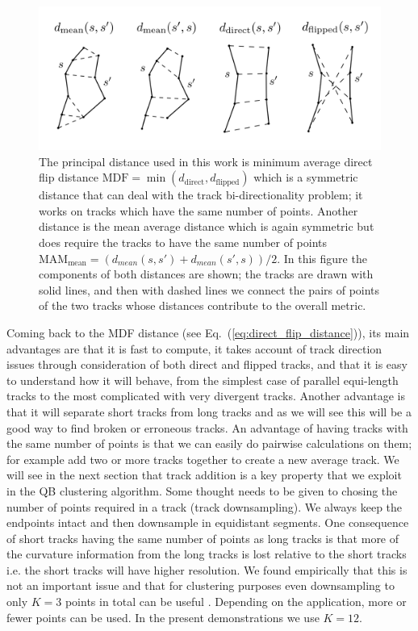 \documentclass[preprint,authoryear,a4paper,10pt,onecolumn]{elsarticle}
\begin{document}
\begin{figure}
\includegraphics[scale=0.5]{distances2}
\centering{}\caption{The principal distance used in this work is minimum average
direct flip distance $\textrm{MDF}=\min(d_{\textrm{direct}},d_{\textrm{flipped}})$
which is a symmetric distance that can deal with the track bi-directionality
problem; it works on tracks which have the same number of points.
Another distance is the mean average distance which is again symmetric
but does require the tracks to have the same number of points
$\textrm{MAM}_{\textrm{mean}}=(d_{mean}(s,s')+d_{mean}(s',s))/2$.
In this figure the components of both distances are shown; the tracks are drawn with solid
lines, and then with dashed lines we connect the
pairs of points of the two tracks whose distances contribute to the
overall metric.\label{Flo:Distances_used}}
\end{figure}

Coming back to the MDF distance (see Eq.~(\ref{eq:direct_flip_distance})),
its main advantages are that it is fast to compute, it takes account of
track direction issues through consideration of both direct and flipped
tracks, and that it is easy to understand how it will behave, from the
simplest case of parallel equi-length tracks to the most complicated
with very divergent tracks. Another advantage is that it will separate
short tracks from long tracks and as we will see this will be a good way
to find broken or erroneous tracks. An advantage of having tracks with
the same number of points is that we can easily do pairwise calculations
on them; for example add two or more tracks together to create a new
average track. We will see in the next section that track addition is a
key property that we exploit in the QB clustering algorithm.  Some
thought needs to be given to chosing the number of points
required in a track (track downsampling). We always keep the endpoints
intact and then downsample in equidistant segments. One consequence of short
tracks having the same number of points as long tracks is that more
of the curvature information from the long tracks is lost relative to the short
tracks i.e. the short tracks will have higher resolution.  We found
empirically that this is not an important issue and that for clustering
purposes even downsampling to only $K=3$ points in total can be useful
\citep{EGMB10}. Depending on the application, more or fewer points can be
used. In the present demonstrations we use $K=12$.
\end{document}
